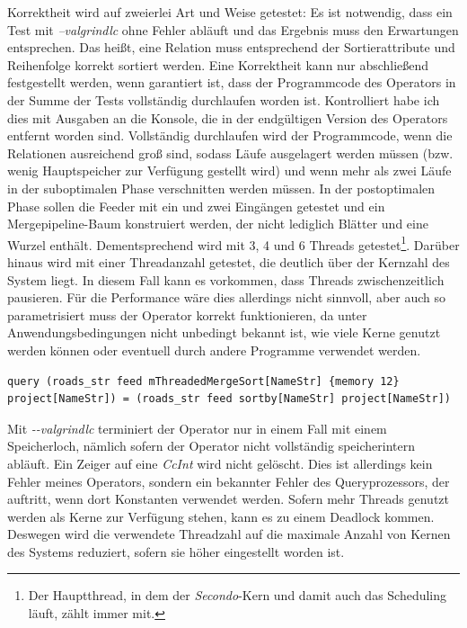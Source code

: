 \documentclass[a4paper,12pt,twoside]{article}
\newcommand{\Fb}[1]{\textit{#1}} %
\begin{document}
Korrektheit wird auf zweierlei Art und Weise getestet: Es ist notwendig, dass ein Test mit \Fb{--valgrindlc} ohne Fehler abläuft und das Ergebnis muss den Erwartungen entsprechen. Das heißt, eine Relation muss entsprechend der Sortierattribute und Reihenfolge korrekt sortiert werden. Eine Korrektheit kann nur abschließend festgestellt werden, wenn garantiert ist, dass der Programmcode des Operators in der Summe der Tests vollständig durchlaufen worden ist. Kontrolliert habe ich dies mit Ausgaben an die Konsole, die in der endgültigen Version des Operators entfernt worden sind. Vollständig durchlaufen wird der Programmcode, wenn die Relationen ausreichend groß sind, sodass Läufe ausgelagert werden müssen (bzw. wenig Hauptspeicher zur Verfügung gestellt wird) und wenn mehr als zwei Läufe in der suboptimalen Phase verschnitten werden müssen. In der postoptimalen Phase sollen die Feeder mit ein und zwei Eingängen getestet und ein Mergepipeline-Baum konstruiert werden, der nicht lediglich Blätter und eine Wurzel enthält. Dementsprechend wird mit 3, 4 und 6 Threads getestet\footnote{Der Hauptthread, in dem der \Fb{Secondo}-Kern und damit auch das Scheduling läuft, zählt immer mit.}. Darüber hinaus wird mit einer Threadanzahl getestet, die deutlich über der Kernzahl des System liegt. In diesem Fall kann es vorkommen, dass Threads zwischenzeitlich pausieren. Für die Performance wäre dies allerdings nicht sinnvoll, aber auch so parametrisiert muss der Operator korrekt funktionieren, da unter Anwendungsbedingungen nicht unbedingt bekannt ist, wie viele Kerne genutzt werden können oder eventuell durch andere Programme verwendet werden.

\begin{minipage}{0.95\textwidth}
	\begin{lstlisting}[caption={Beispiel Testqueries für den Sort-Operator.}, label=list:testsort]
	query (roads_str feed mThreadedMergeSort[NameStr] {memory 12} project[NameStr]) = (roads_str feed sortby[NameStr] project[NameStr]) 
	\end{lstlisting}
\end{minipage}

Mit \Fb{-{}-valgrindlc} terminiert der Operator nur in einem Fall mit einem Speicherloch, nämlich sofern der Operator nicht vollständig speicherintern abläuft. Ein Zeiger auf eine \Fb{CcInt} wird nicht gelöscht. Dies ist allerdings kein Fehler meines Operators, sondern ein bekannter Fehler des Queryprozessors, der auftritt, wenn dort Konstanten verwendet werden. Sofern mehr Threads genutzt werden als Kerne zur Verfügung stehen, kann es zu einem Deadlock kommen. Deswegen wird die verwendete Threadzahl auf die maximale Anzahl von Kernen des Systems reduziert, sofern sie höher eingestellt worden ist. 
\end{document}
